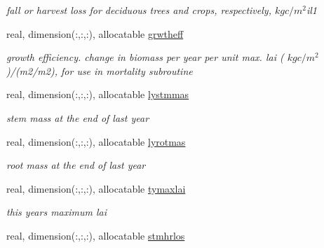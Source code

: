 \begin{DoxyCompactItemize}
\begin{DoxyCompactList}\small\item\em fall or harvest loss for deciduous trees and crops, respectively, $kg c/m^2$il1 \end{DoxyCompactList}\item 
\hypertarget{structctem__statevars_1_1veg__rot_a9190dec99b6d51c0292ea9b5c7353b46}{}real, dimension(\+:,\+:,\+:), allocatable \hyperlink{structctem__statevars_1_1veg__rot_a9190dec99b6d51c0292ea9b5c7353b46}{grwtheff}\label{structctem__statevars_1_1veg__rot_a9190dec99b6d51c0292ea9b5c7353b46}

\begin{DoxyCompactList}\small\item\em growth efficiency. change in biomass per year per unit max. lai ( $kg c/m^2$)/(m2/m2), for use in mortality subroutine \end{DoxyCompactList}\item 
\hypertarget{structctem__statevars_1_1veg__rot_a8e533f301001b882a885e65d4495baae}{}real, dimension(\+:,\+:,\+:), allocatable \hyperlink{structctem__statevars_1_1veg__rot_a8e533f301001b882a885e65d4495baae}{lystmmas}\label{structctem__statevars_1_1veg__rot_a8e533f301001b882a885e65d4495baae}

\begin{DoxyCompactList}\small\item\em stem mass at the end of last year \end{DoxyCompactList}\item 
\hypertarget{structctem__statevars_1_1veg__rot_ae95794630e8c0ce681bb7f35985b38b9}{}real, dimension(\+:,\+:,\+:), allocatable \hyperlink{structctem__statevars_1_1veg__rot_ae95794630e8c0ce681bb7f35985b38b9}{lyrotmas}\label{structctem__statevars_1_1veg__rot_ae95794630e8c0ce681bb7f35985b38b9}

\begin{DoxyCompactList}\small\item\em root mass at the end of last year \end{DoxyCompactList}\item 
\hypertarget{structctem__statevars_1_1veg__rot_a8a63daa0c80d8f2a3304369de75f676d}{}real, dimension(\+:,\+:,\+:), allocatable \hyperlink{structctem__statevars_1_1veg__rot_a8a63daa0c80d8f2a3304369de75f676d}{tymaxlai}\label{structctem__statevars_1_1veg__rot_a8a63daa0c80d8f2a3304369de75f676d}

\begin{DoxyCompactList}\small\item\em this year\textquotesingle{}s maximum lai \end{DoxyCompactList}\item 
\hypertarget{structctem__statevars_1_1veg__rot_a3a37a95087eb2b7e97a0bbb294104067}{}real, dimension(\+:,\+:,\+:), allocatable \hyperlink{structctem__statevars_1_1veg__rot_a3a37a95087eb2b7e97a0bbb294104067}{stmhrlos}\label{structctem__statevars_1_1veg__rot_a3a37a95087eb2b7e97a0bbb294104067}


\end{DoxyCompactItemize}
